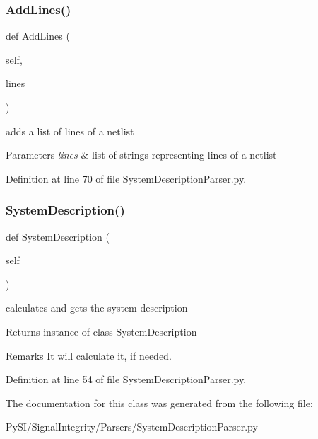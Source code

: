 \subsubsection{\texorpdfstring{Add\+Lines()}{AddLines()}}
{\footnotesize\ttfamily def Add\+Lines (\begin{DoxyParamCaption}\item[{}]{self,  }\item[{}]{lines }\end{DoxyParamCaption})}



adds a list of lines of a netlist 


\begin{DoxyParams}{Parameters}
{\em lines} & list of strings representing lines of a netlist \\
\hline
\end{DoxyParams}


Definition at line 70 of file System\+Description\+Parser.\+py.

\mbox{\label{classSignalIntegrity_1_1Parsers_1_1SystemDescriptionParser_1_1SystemDescriptionParser_acfebed448a60c7903add117ba0d3c162}} 
\subsubsection{\texorpdfstring{System\+Description()}{SystemDescription()}}
{\footnotesize\ttfamily def System\+Description (\begin{DoxyParamCaption}\item[{}]{self }\end{DoxyParamCaption})}



calculates and gets the system description 

\begin{DoxyReturn}{Returns}
instance of class System\+Description 
\end{DoxyReturn}
\begin{DoxyRemark}{Remarks}
It will calculate it, if needed. 
\end{DoxyRemark}


Definition at line 54 of file System\+Description\+Parser.\+py.



The documentation for this class was generated from the following file\+:\begin{DoxyCompactItemize}
\item 
Py\+S\+I/\+Signal\+Integrity/\+Parsers/System\+Description\+Parser.\+py\end{DoxyCompactItemize}
